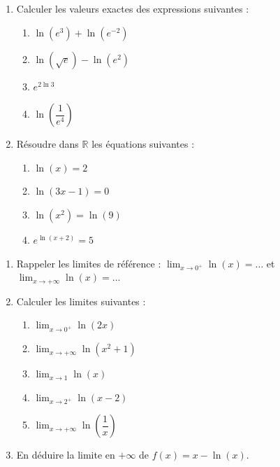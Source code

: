 \documentclass[11pt]{article}
\begin{document}
\begin{exercice}
\begin{enumerate}
    \item Calculer les valeurs exactes des expressions suivantes :
    \begin{enumerate}
        \item $\ln(e^3) + \ln(e^{-2})$
        \item $\ln(\sqrt{e}) - \ln(e^2)$
        \item $e^{2\ln 3}$
        \item $\ln\left(\dfrac{1}{e^4}\right)$
    \end{enumerate}
    \item Résoudre dans $\mathbb{R}$ les équations suivantes :
    \begin{enumerate}
        \item $\ln(x) = 2$
        \item $\ln(3x-1) = 0$
        \item $\ln(x^2) = \ln(9)$
        \item $e^{\ln(x+2)} = 5$
    \end{enumerate}
\end{enumerate}
\end{exercice}

\begin{exercice}
\begin{enumerate}
    \item Rappeler les limites de référence :
    $\lim_{x \to 0^+} \ln(x) = \dots$ \quad et \quad $\lim_{x \to +\infty} \ln(x) = \dots$
    \item Calculer les limites suivantes :
    \begin{enumerate}
        \item $\lim_{x \to 0^+} \ln(2x)$
        \item $\lim_{x \to +\infty} \ln(x^2+1)$
        \item $\lim_{x \to 1} \ln(x)$
        \item $\lim_{x \to 2^+} \ln(x-2)$
        \item $\lim_{x \to +\infty} \ln\left(\dfrac{1}{x}\right)$
    \end{enumerate}
    \item En déduire la limite en $+\infty$ de $f(x) = x - \ln(x)$.
\end{enumerate}
\end{exercice}
\end{document}
